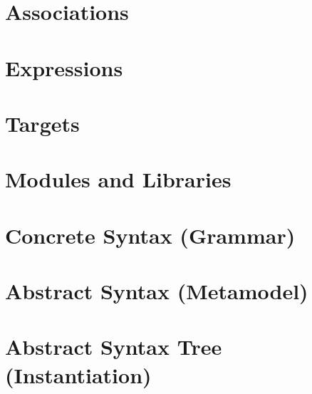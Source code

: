 \documentclass[a4paper,oneside,14pt, extrafontsizes]{memoir}
\begin{document}
\chapter{Associations}


\chapter{Expressions}

\chapter{Targets}
\label{ch:targets}

\chapter{Modules and Libraries}

\appendix

\chapter{Concrete Syntax (Grammar)}


\chapter{Abstract Syntax (Metamodel)}


\chapter{Abstract Syntax Tree (Instantiation)}


\backmatter



\end{document}
